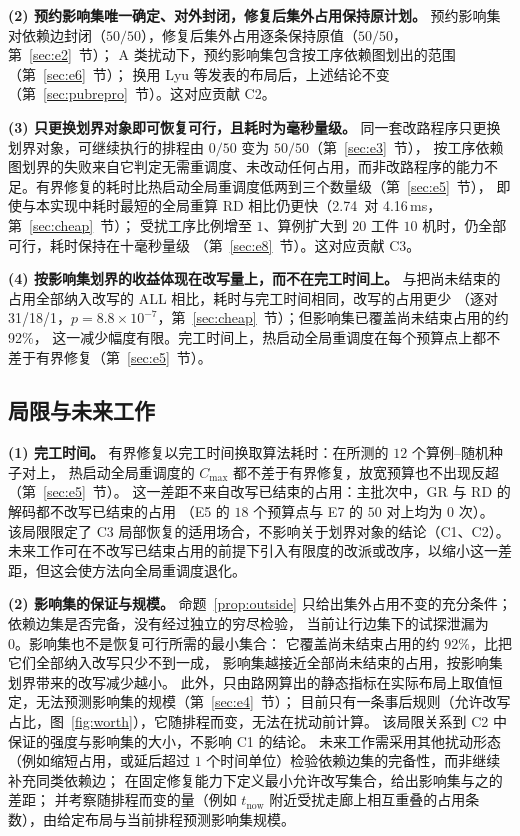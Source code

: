 \documentclass[manuscript,screen,review]{acmart}
\newcommand{\NPairs}{50}
\newcommand{\FeasRone}{0/\NPairs}            %
\newcommand{\FeasRtwo}{\NPairs/\NPairs}      %
\newcommand{\PassClosed}{\NPairs/\NPairs}    %
\newcommand{\PassInvar}{\NPairs/\NPairs}     %
\newcommand{\EfiveCells}{12}        %
\newcommand{\ClosureAliveFrac}{92\%}
\newcommand{\MsRedecode}{4.16}       %
\newcommand{\MsCheapRtwo}{2.74}      %
\newcommand{\RAStabWTL}{31/18/1}     %
\newcommand{\RAStabP}{8.8\times10^{-7}}  %
\newcommand{\ScaleJobsHi}{20}
\newcommand{\ScaleMachHi}{10}
\newcommand{\ProbeLeaks}{0}
\begin{document}
\textbf{(2) 预约影响集唯一确定、对外封闭，修复后集外占用保持原计划。}
预约影响集对依赖边封闭（\(\PassClosed\)），修复后集外占用逐条保持原值（\(\PassInvar\)，第~\ref{sec:e2}~节）；
A 类扰动下，预约影响集包含按工序依赖图划出的范围（第~\ref{sec:e6}~节）；
换用 Lyu 等发表的布局后，上述结论不变（第~\ref{sec:pubrepro}~节）。这对应贡献 C2。

\textbf{(3) 只更换划界对象即可恢复可行，且耗时为毫秒量级。}
同一套改路程序只更换划界对象，可继续执行的排程由 \(\FeasRone\) 变为 \(\FeasRtwo\)（第~\ref{sec:e3}~节），
按工序依赖图划界的失败来自它判定无需重调度、未改动任何占用，而非改路程序的能力不足。有界修复的耗时比热启动全局重调度低两到三个数量级（第~\ref{sec:e5}~节），
即使与本实现中耗时最短的全局重算 RD 相比仍更快（\MsCheapRtwo\ 对 \MsRedecode\,ms，第~\ref{sec:cheap}~节）；
受扰工序比例增至 \(1\)、算例扩大到 \(\ScaleJobsHi\) 工件 \(\ScaleMachHi\) 机时，仍全部可行，耗时保持在十毫秒量级
（第~\ref{sec:e8}~节）。这对应贡献 C3。

\textbf{(4) 按影响集划界的收益体现在改写量上，而不在完工时间上。}
与把尚未结束的占用全部纳入改写的 ALL 相比，耗时与完工时间相同，改写的占用更少
（逐对 \RAStabWTL，\(p=\RAStabP\)，第~\ref{sec:cheap}~节）；但影响集已覆盖尚未结束占用的约 \ClosureAliveFrac，
这一减少幅度有限。完工时间上，热启动全局重调度在每个预算点上都不差于有界修复（第~\ref{sec:e5}~节）。

\subsection{局限与未来工作}
\label{sec:limitations}

\textbf{(1) 完工时间。}
有界修复以完工时间换取算法耗时：在所测的 \(\EfiveCells\) 个算例--随机种子对上，
热启动全局重调度的 \(C_{\max}\) 都不差于有界修复，放宽预算也不出现反超（第~\ref{sec:e5}~节）。
这一差距不来自改写已结束的占用：主批次中，GR 与 RD 的解码都不改写已结束的占用
（E5 的 \(18\) 个预算点与 E7 的 \(\NPairs\) 对上均为 \(0\) 次）。
该局限限定了 C3 局部恢复的适用场合，不影响关于划界对象的结论（C1、C2）。
未来工作可在不改写已结束占用的前提下引入有限度的改派或改序，以缩小这一差距，但这会使方法向全局重调度退化。

\textbf{(2) 影响集的保证与规模。}
命题~\ref{prop:outside} 只给出集外占用不变的充分条件；依赖边集是否完备，没有经过独立的穷尽检验，
当前让行边集下的试探泄漏为 \ProbeLeaks。影响集也不是恢复可行所需的最小集合：
它覆盖尚未结束占用的约 \(\ClosureAliveFrac\)，比把它们全部纳入改写只少不到一成，
影响集越接近全部尚未结束的占用，按影响集划界带来的改写减少越小。
此外，只由路网算出的静态指标在实际布局上取值恒定，无法预测影响集的规模（第~\ref{sec:e4}~节）；
目前只有一条事后规则（允许改写占比，图~\ref{fig:worth}），它随排程而变，无法在扰动前计算。
该局限关系到 C2 中保证的强度与影响集的大小，不影响 C1 的结论。
未来工作需采用其他扰动形态（例如缩短占用，或延后超过 \(1\) 个时间单位）检验依赖边集的完备性，而非继续补充同类依赖边；
在固定修复能力下定义最小允许改写集合，给出影响集与之的差距；
并考察随排程而变的量（例如 \(t_{\mathrm{now}}\) 附近受扰走廊上相互重叠的占用条数），由给定布局与当前排程预测影响集规模。
\end{document}
